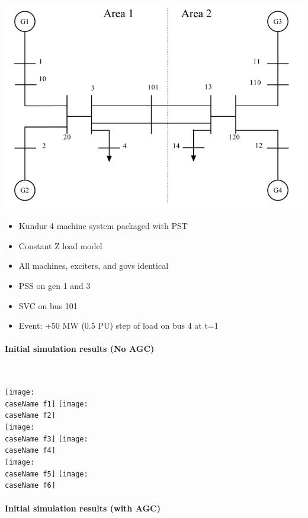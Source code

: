 \documentclass[12pt]{article}
\begin{document}
\begin{center}
\includegraphics[width=.75\linewidth]{sysOneLineAreas}
\end{center}
\begin{itemize}
\item Kundur  4 machine system packaged with PST
\item Constant Z load model
\item All machines, exciters, and govs identical
\item PSS on gen 1 and 3
\item SVC on bus 101
\item Event: +50 MW (0.5 PU) step of load on bus 4 at t=1
\end{itemize}

\pagebreak
\paragraph{Initial simulation results (No AGC)} \ \\


\begin{center}
\newcommand{\caseName}{NoAGC}
\texttt{[image: \\caseName f1]} %
\texttt{[image: \\caseName f2]} \\%
\texttt{[image: \\caseName f3]} %
\texttt{[image: \\caseName f4]} \\%
\texttt{[image: \\caseName f5]} %
\texttt{[image: \\caseName f6]} \\%
\end{center}

\pagebreak
\paragraph{Initial simulation results (with AGC)} \ \\
\end{document}
